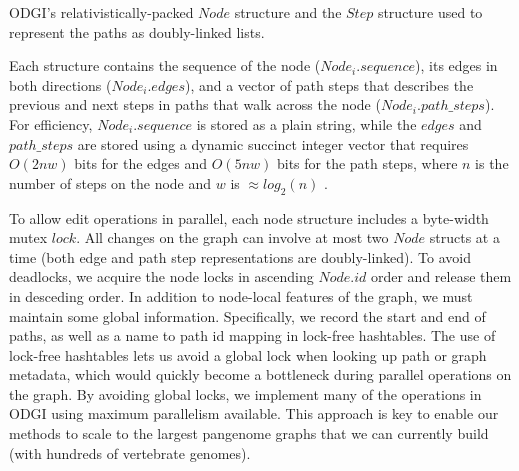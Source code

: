 \documentclass{bioinfo}
\begin{document}
\begin{algorithm}
\caption{ODGI's relativistically-packed $Node$ structure and the $Step$ structure used to represent the paths as doubly-linked lists.}
\label{alg:structs}
\end{algorithm}

Each structure contains the sequence of the node ($Node_i.sequence$), its edges in both directions ($Node_i.edges$), and a vector of path steps that describes the previous and next steps in paths that walk across the node ($Node_i.path\_steps$).
For efficiency, $Node_i.sequence$ is stored as a plain string, while the $edges$ and $path\_steps$ are stored using a dynamic succinct integer vector that requires $O(2nw)$ bits for the edges and $O(5nw)$ bits for the path steps, where $n$ is the number of steps on the node and $w$ is $\approx log_2(n)$ \citep{prezza2017framework}.

To allow edit operations in parallel, each node structure includes a byte-width mutex $lock$.
All changes on the graph can involve at most two $Node$ structs at a time (both edge and path step representations are doubly-linked).
To avoid deadlocks, we acquire the node locks in ascending $Node.id$ order and release them in desceding order.
In addition to node-local features of the graph, we must maintain some global information.
Specifically, we record the start and end of paths, as well as a name to path id mapping in lock-free hashtables.
The use of lock-free hashtables lets us avoid a global lock when looking up path or graph metadata, which would quickly become a bottleneck during parallel operations on the graph.
By avoiding global locks, we implement many of the operations in ODGI using maximum parallelism available.
This approach is key to enable our methods to scale to the largest pangenome graphs that we can currently build (with hundreds of vertebrate genomes).
\end{document}
